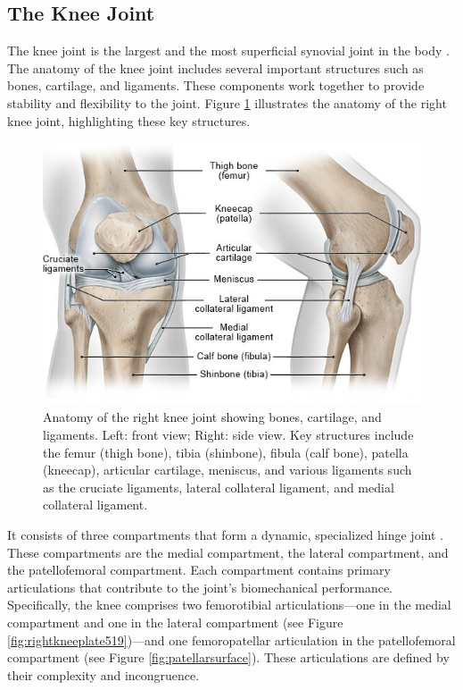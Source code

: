 \documentclass{micro-econ-thesis}
\begin{document}
\subsection{The Knee Joint }

The knee joint is the largest and the most superficial synovial joint in the body \parencite{dalley_moores_2023}. The anatomy of the knee joint includes several important structures such as bones, cartilage, and ligaments. These components work together to provide stability and flexibility to the joint. Figure \ref{fig:kniearthrosekniegelenk-anatomieenjpg} illustrates the anatomy of the right knee joint, highlighting these key structures.
\begin{figure}[H]
	\centering
	\includegraphics[width=0.7\linewidth]{kniearthrose_kniegelenk-anatomie_enjpg}
	\caption{Anatomy of the right knee joint showing bones, cartilage, and ligaments. Left: front view; Right: side view. Key structures include the femur (thigh bone), tibia (shinbone), fibula (calf bone), patella (kneecap), articular cartilage, meniscus, and various ligaments such as the cruciate ligaments, lateral collateral ligament, and medial collateral ligament. \parencite{informedhealth2021}}
	\label{fig:kniearthrosekniegelenk-anatomieenjpg}
\end{figure}

 
It consists of three compartments that form a dynamic, specialized hinge joint \parencite[p.1395]{standring_grays_2021}. These compartments are the medial compartment, the lateral compartment, and the patellofemoral compartment.
Each compartment contains primary articulations that contribute to the joint's biomechanical performance. Specifically, the knee comprises two femorotibial articulations—one in the medial compartment and one in the lateral compartment (see Figure \ref{fig:rightkneeplate519})—and one femoropatellar articulation in the patellofemoral compartment (see Figure \ref{fig:patellarsurface}). These articulations are defined by their complexity and incongruence. 
 
\end{document}
